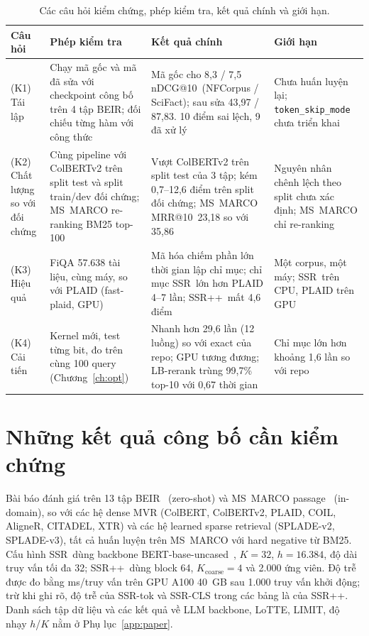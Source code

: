 \documentclass[a4paper,13pt]{extreport}
\makeatletter
\theoremstyle{plain}
\newcommand{\ssr}{SSR}
\newcommand{\ssrpp}{SSR++}
\newcommand{\ndcg}{nDCG@10}
\newcommand{\mrr}{MRR@10}
\makeatother
\begin{document}
\begin{table}[htbp]
\centering
\caption{Các câu hỏi kiểm chứng, phép kiểm tra, kết quả chính và giới hạn.}
\label{tab:questions}
\footnotesize
\begin{tabular}{P{1.9cm}P{3.6cm}P{4.6cm}P{3.3cm}}
\toprule
\textbf{Câu hỏi} & \textbf{Phép kiểm tra} & \textbf{Kết quả chính} & \textbf{Giới hạn}\\
\midrule
(K1) Tái lập & Chạy mã gốc và mã đã sửa với checkpoint công bố trên 4 tập BEIR; đối chiếu từng hàm với công thức & Mã gốc cho 8,3 / 7,5 \ndcg\ (NFCorpus / SciFact); sau sửa 43,97 / 87,83. 10 điểm sai lệch, 9 đã xử lý & Chưa huấn luyện lại; \texttt{token\_skip\_mode} chưa triển khai\\
(K2) Chất lượng so với đối chứng & Cùng pipeline với ColBERTv2 trên split test và split train/dev đối chứng; MS~MARCO re-ranking BM25 top-100 & Vượt ColBERTv2 trên split test của 3 tập; kém 0,7--12,6 điểm trên split đối chứng; MS~MARCO \mrr\ 23,18 so với 35,86 & Nguyên nhân chênh lệch theo split chưa xác định; MS~MARCO chỉ re-ranking\\
(K3) Hiệu quả & FiQA 57.638 tài liệu, cùng máy, so với PLAID (fast-plaid, GPU) & Mã hóa chiếm phần lớn thời gian lập chỉ mục; chỉ mục \ssr\ lớn hơn PLAID 4--7 lần; \ssrpp\ mất 4,6 điểm & Một corpus, một máy; \ssr\ trên CPU, PLAID trên GPU\\
(K4) Cải tiến & Kernel mới, test từng bit, đo trên cùng 100 query (Chương~\ref{ch:opt}) & Nhanh hơn 29,6 lần (12 luồng) so với exact của repo; GPU tương đương; LB-rerank trùng 99,7\% top-10 với 0,67 thời gian & Chỉ mục lớn hơn khoảng 1,6 lần so với repo\\
\bottomrule
\end{tabular}
\end{table}

\section{Những kết quả công bố cần kiểm chứng}
\label{sec:paper-claims}
Bài báo đánh giá trên 13 tập BEIR~\cite{thakur2021} (zero-shot) và MS~MARCO passage~\cite{nguyen2016} (in-domain), so với các hệ dense MVR (ColBERT, ColBERTv2, PLAID, COIL, AligneR, CITADEL, XTR) và các hệ learned sparse retrieval (SPLADE-v2, SPLADE-v3), tất cả huấn luyện trên MS~MARCO với hard negative từ BM25. Cấu hình \ssr\ dùng backbone BERT-base-uncased~\cite{devlin2019}, $K=32$, $h=16.384$, độ dài truy vấn tối đa 32; \ssrpp\ dùng block 64, $K_{\mathrm{coarse}}=4$ và 2.000 ứng viên. Độ trễ được đo bằng ms/truy vấn trên GPU A100 40~GB sau 1.000 truy vấn khởi động; trừ khi ghi rõ, độ trễ của \ssr-tok và \ssr-CLS trong các bảng là của \ssrpp. Danh sách tập dữ liệu và các kết quả về LLM backbone, LoTTE, LIMIT, độ nhạy $h$/$K$ nằm ở Phụ lục~\ref{app:paper}.
\end{document}
